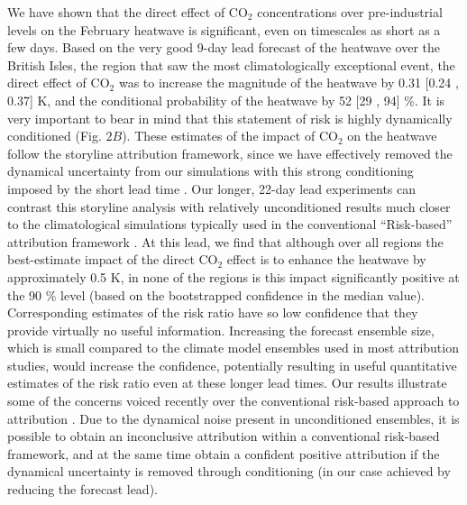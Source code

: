   We have shown that the direct effect of CO$_2$ concentrations over pre-industrial levels on the February heatwave is significant, even on timescales as short as a few days. Based on the very good 9-day lead forecast of the heatwave over the British Isles, the region that saw the most climatologically exceptional event, the direct effect of CO$_2$ was to increase the magnitude of the heatwave by 0.31 [0.24 , 0.37] K, and the conditional probability of the heatwave by 52 [29 , 94] \%. It is very important to bear in mind that this statement of risk is highly dynamically conditioned (Fig. $2B$). These estimates of the impact of CO$_2$ on the heatwave follow the storyline attribution framework, since we have effectively removed the dynamical uncertainty from our simulations with this strong conditioning imposed by the short lead time \citep{shepherd_common_2016,shepherd_storylines_2018,jezequel_behind_2018}. Our longer, 22-day lead experiments can contrast this storyline analysis with relatively unconditioned results much closer to the climatological simulations typically used in the conventional ``Risk-based'' attribution framework \citep{philip_protocol_2020,stott_human_2004}. At this lead, we find that although over all regions the best-estimate impact of the direct CO$_2$ effect is to enhance the heatwave by approximately 0.5 K, in none of the regions is this impact significantly positive at the 90 \% level (based on the bootstrapped confidence in the median value). Corresponding estimates of the risk ratio have so low confidence that they provide virtually no useful information. Increasing the forecast ensemble size, which is small compared to the climate model ensembles used in most attribution studies, would increase the confidence, potentially resulting in useful quantitative estimates of the risk ratio even at these longer lead times. Our results illustrate some of the concerns voiced recently over the conventional risk-based approach to attribution \citep{winsberg_severe_2020,shepherd_common_2016}. Due to the dynamical noise present in unconditioned ensembles, it is possible to obtain an inconclusive attribution within a conventional risk-based framework, and at the same time obtain a confident positive attribution if the dynamical uncertainty is removed through conditioning (in our case achieved by reducing the forecast lead).
  
